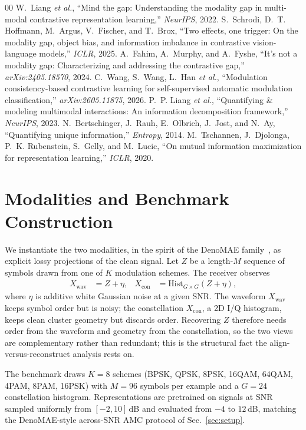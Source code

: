 \documentclass[conference]{IEEEtran}
\begin{document}
\begin{thebibliography}{00}
 W.~Liang \emph{et al.}, ``Mind the gap: Understanding the modality
gap in multi-modal contrastive representation learning,'' \emph{NeurIPS}, 2022.
 S.~Schrodi, D.~T. Hoffmann, M.~Argus, V.~Fischer, and T.~Brox,
``Two effects, one trigger: On the modality gap, object bias, and information
imbalance in contrastive vision-language models,'' \emph{ICLR}, 2025.
 A.~Fahim, A.~Murphy, and A.~Fyshe, ``It's not a modality gap:
Characterizing and addressing the contrastive gap,'' \emph{arXiv:2405.18570}, 2024.
 C.~Wang, S.~Wang, L.~Han \emph{et al.}, ``Modulation
consistency-based contrastive learning for self-supervised automatic modulation
classification,'' \emph{arXiv:2605.11875}, 2026.
 P.~P. Liang \emph{et al.}, ``Quantifying \& modeling multimodal
interactions: An information decomposition framework,'' \emph{NeurIPS}, 2023.
 N.~Bertschinger, J.~Rauh, E.~Olbrich, J.~Jost, and N.~Ay,
``Quantifying unique information,'' \emph{Entropy}, 2014.
 M.~Tschannen, J.~Djolonga, P.~K. Rubenstein, S.~Gelly, and
M.~Lucic, ``On mutual information maximization for representation learning,''
\emph{ICLR}, 2020.
\end{thebibliography}

\appendix
\section{Modalities and Benchmark Construction}
\label{app:modalities}
We instantiate the two modalities, in the spirit of the DenoMAE
family~\cite{denomae,denomae2}, as explicit lossy projections of the clean signal. Let $Z$ be a length-$M$ sequence
of symbols drawn from one of $K$ modulation schemes. The receiver observes
\begin{align}
X_{\text{wav}} &= Z + \eta, &
X_{\text{con}} &= \mathrm{Hist}_{G\times G}(Z+\eta),
\end{align}
where $\eta$ is additive white Gaussian noise at a given SNR. The waveform
$X_{\text{wav}}$ keeps symbol order but is noisy; the constellation $X_{\text{con}}$,
a 2D I/Q histogram, keeps clean cluster geometry but discards order. Recovering $Z$
therefore needs order from the waveform and geometry from the constellation, so the
two views are complementary rather than redundant; this is the structural fact the
align-versus-reconstruct analysis rests on.

The benchmark draws $K{=}8$ schemes (BPSK, QPSK, 8PSK, 16QAM, 64QAM, 4PAM, 8PAM,
16PSK) with $M{=}96$ symbols per example and a $G{=}24$ constellation histogram.
Representations are pretrained on signals at SNR sampled uniformly from
$[-2,10]$\,dB and evaluated from $-4$ to $12$\,dB, matching the DenoMAE-style
across-SNR AMC protocol of Sec.~\ref{sec:setup}.
\end{document}
